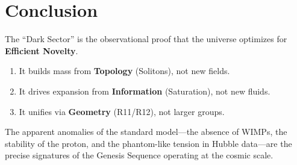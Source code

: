 \documentclass[11pt,a4paper]{article}
\theoremstyle{definition}
\theoremstyle{plain}
\theoremstyle{remark}
\begin{document}
\section{Conclusion}

The ``Dark Sector'' is the observational proof that the universe optimizes for \textbf{Efficient Novelty}.

\begin{enumerate}[label=\arabic*.]
    \item It builds mass from \textbf{Topology} (Solitons), not new fields.
    \item It drives expansion from \textbf{Information} (Saturation), not new fluids.
    \item It unifies via \textbf{Geometry} (R11/R12), not larger groups.
\end{enumerate}

The apparent anomalies of the standard model---the absence of WIMPs, the stability of the proton, and the phantom-like tension in Hubble data---are the precise signatures of the Genesis Sequence operating at the cosmic scale.

% 
% 
\end{document}
